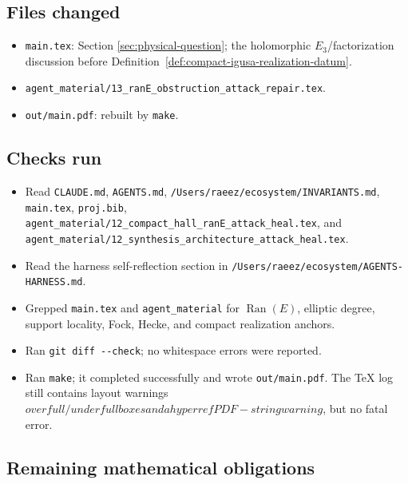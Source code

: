 \subsection{Files changed}

\begin{itemize}
\item \verb|main.tex|: Section \ref{sec:physical-question}; the
holomorphic \(E_3\)/factorization discussion before
Definition~\ref{def:compact-igusa-realization-datum}.
\item \verb|agent_material/13_ranE_obstruction_attack_repair.tex|.
\item \verb|out/main.pdf|: rebuilt by \verb|make|.
\end{itemize}

\subsection{Checks run}

\begin{itemize}
\item Read \verb|CLAUDE.md|, \verb|AGENTS.md|,
\verb|/Users/raeez/ecosystem/INVARIANTS.md|, \verb|main.tex|,
\verb|proj.bib|, \verb|agent_material/12_compact_hall_ranE_attack_heal.tex|,
and \verb|agent_material/12_synthesis_architecture_attack_heal.tex|.
\item Read the harness self-reflection section in
\verb|/Users/raeez/ecosystem/AGENTS-HARNESS.md|.
\item Grepped \verb|main.tex| and \verb|agent_material| for
\(\operatorname{Ran}(E)\), elliptic degree, support locality, Fock,
Hecke, and compact realization anchors.
\item Ran \verb|git diff --check|; no whitespace errors were reported.
\item Ran \verb|make|; it completed successfully and wrote
\verb|out/main.pdf|.  The TeX log still contains layout warnings
\(overfull/underfull boxes and a hyperref PDF-string warning\), but no
fatal error.
\end{itemize}

\subsection{Remaining mathematical obligations}

